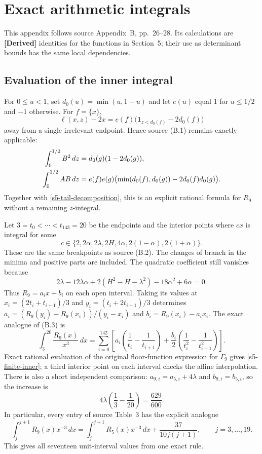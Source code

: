\section{Exact arithmetic integrals}
\label{appb-integrals}

This appendix follows source Appendix~B, pp.~26--28.  Its calculations
are \textbf{[Derived]} identities for the functions in Section~5;
their use as determinant bounds has the same local dependencies.

\subsection{Evaluation of the inner integral}
\label{appb-inner}

For $0\leq u<1$, set $d_0(u)=\min(u,1-u)$ and let $e(u)$ equal
$1$ for $u\leq1/2$ and $-1$ otherwise.  For $f=\{x\}$,
\[
 \ell(x,z)-2x=e(f)\bigl(\boldsymbol{1}_{z<d_0(f)}-2d_0(f)\bigr)
\]
away from a single irrelevant endpoint.  Hence source (B.1) remains
exactly applicable:
\begin{align}
 \int_0^{1/2}B^2\,dz&=d_0(g)(1-2d_0(g)),\notag\\
 \int_0^{1/2}AB\,dz&=e(f)e(g)
       \bigl(\min(d_0(f),d_0(g))-2d_0(f)d_0(g)\bigr).
 \label{appb-fractional-parts}
\end{align}
Together with \eqref{s5-tail-decomposition}, this is an explicit
rational formula for $R_9$ without a remaining $z$-integral.

Let $3=t_0<\cdots<t_{143}=20$ be the endpoints and the interior
points where $cx$ is integral for some
\[
 c\in\{2,2\alpha,2\lambda,2H,4\alpha,2(1-\alpha),2(1+\alpha)\}.
\]
These are the same breakpoints as source (B.2).  The changes of branch
in the minima and positive parts are included.  The quadratic
coefficient still vanishes because
\[
 2\lambda-12\lambda\alpha
 +2(H^2-H-\lambda^2)-18\alpha^2+6\alpha=0.
\]
Thus $R_9=a_i x+b_i$ on each open interval.  Taking its values at
$x_i=(2t_i+t_{i+1})/3$ and $y_i=(t_i+2t_{i+1})/3$ determines
$a_i=(R_9(y_i)-R_9(x_i))/(y_i-x_i)$ and
$b_i=R_9(x_i)-a_i x_i$.  The exact analogue of (B.3) is
\begin{equation}
 \int_3^{20}\frac{R_9(x)}{x^3}\,dx
 =\sum_{i=0}^{142}\left[
 a_i\left(\frac1{t_i}-\frac1{t_{i+1}}\right)
 +\frac{b_i}{2}\left(\frac1{t_i^2}-\frac1{t_{i+1}^2}\right)
 \right].
 \label{appb-inner-sum}
\end{equation}
Exact rational evaluation of the original floor-function expression
for $\Gamma_9$ gives \eqref{s5-finite-inner}; a third interior point
on each interval checks the affine interpolation.  There is also a
short independent comparison: $a_{9,i}=a_{5,i}+4\lambda$ and
$b_{9,i}=b_{5,i}$, so the increase is
\[
 4\lambda\left(\frac13-\frac1{20}\right)=\frac{629}{600}.
\]
In particular, every entry of source Table~3 has the explicit analogue
\[
 \int_j^{j+1}R_9(x)x^{-3}\,dx
 =\int_j^{j+1}R_5(x)x^{-3}\,dx+\frac{37}{10j(j+1)},
 \qquad j=3,\ldots,19.
\]
This gives all seventeen unit-interval values from one exact rule.

